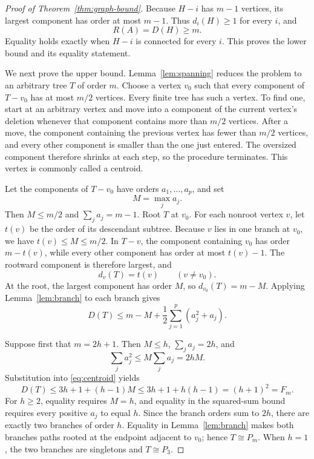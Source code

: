 \documentclass[preprint,12pt,authoryear]{elsarticle}
\begin{document}
\begin{proof}[Proof of Theorem~\ref{thm:graph-bound}]
Because \(H-i\) has \(m-1\) vertices, its largest component has order at most
\(m-1\). Thus \(d_i(H)\geq1\) for every \(i\), and
\[
 R(A)=D(H)\geq m.
\]
Equality holds exactly when \(H-i\) is connected for every \(i\). This proves
the lower bound and its equality statement.

We next prove the upper bound. Lemma~\ref{lem:spanning} reduces the problem to
an arbitrary tree \(T\) of order \(m\). Choose a vertex \(v_0\) such that every
component of \(T-v_0\) has at most \(m/2\) vertices. Every finite tree has such
a vertex. To find one, start at an arbitrary vertex and move into a component of the current
vertex's deletion whenever that component contains more than \(m/2\) vertices.
After a move, the component containing the previous vertex has fewer than
\(m/2\) vertices, and every other component is smaller than the one just
entered. The oversized component therefore shrinks at each step, so the
procedure terminates. This vertex is commonly called a centroid.

Let the components of \(T-v_0\) have orders \(a_1,\ldots,a_p\), and set
\[
 M=\max_j a_j.
\]
Then \(M\leq m/2\) and \(\sum_j a_j=m-1\). Root \(T\) at \(v_0\). For each
nonroot vertex \(v\), let \(t(v)\) be the order of its descendant subtree.
Because \(v\) lies in one branch at \(v_0\), we have
\(t(v)\leq M\leq m/2\). In \(T-v\), the component containing \(v_0\) has
order \(m-t(v)\), while every other component has order at most \(t(v)-1\).
The rootward component is therefore largest, and
\[
 d_v(T)=t(v)\qquad(v\ne v_0).
\]
At the root, the largest component has order \(M\), so
\(d_{v_0}(T)=m-M\). Applying Lemma~\ref{lem:branch} to each branch gives
\begin{equation}
 D(T)\leq m-M+\frac12\sum_{j=1}^p(a_j^2+a_j).
 \label{eq:centroid}
\end{equation}

Suppose first that \(m=2h+1\). Then \(M\leq h\),
\(\sum_j a_j=2h\), and
\[
 \sum_j a_j^2\leq M\sum_j a_j=2hM.
\]
Substitution into \eqref{eq:centroid} yields
\[
 D(T)\leq3h+1+(h-1)M
 \leq3h+1+h(h-1)
 =(h+1)^2=F_m.
\]
For \(h\geq2\), equality requires \(M=h\), and equality in the squared-sum
bound requires every positive \(a_j\) to equal \(h\). Since the branch orders
sum to \(2h\), there are exactly two branches of order \(h\). Equality in
Lemma~\ref{lem:branch} makes both branches paths rooted at the endpoint
adjacent to \(v_0\); hence \(T\cong P_m\). When \(h=1\), the two branches are
singletons and \(T\cong P_3\).


\end{proof}
\end{document}
